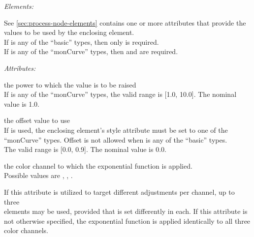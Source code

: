 \emph{Elements:}
\begin{xmlfields}
	\xmlitem[Description][optional] See \autoref{sec:process-node-elements}
	\xmlitem[ExponentParams][required] contains one or more attributes that provide the values to be used by the enclosing  element. \\
	If  is any of the ``basic'' types, then only  is required. \\
	If  is any of the ``monCurve'' types, then  and  are required. \par
	
		\emph{Attributes:}
		\begin{xmlfields}
		    \xmlitem["exponent"][required] the power to which the value is to be raised \\
		    If  is any of the ``monCurve'' types, the valid range is [1.0, 10.0]. The nominal value is 1.0.
		    
		    
		    \xmlitem["offset"][optional] the offset value to use \\
		    If  is used, the enclosing  element's style attribute must be set to one of the ``monCurve'' types. Offset is not allowed when  is any of the ``basic'' types.\\
            The valid range is [0.0, 0.9]. The nominal value is 0.0.
		    
		    
		    \xmlitem["channel"][optional] the color channel to which the exponential function is applied. \\
		    Possible values are , , .
		    
		    If this attribute is utilized to target different adjustments per channel, up to three \\  elements may be used, provided that  is set differently in each. If this attribute is not otherwise specified, the exponential function is applied identically to all three color channels.
		\end{xmlfields}
\end{xmlfields}



